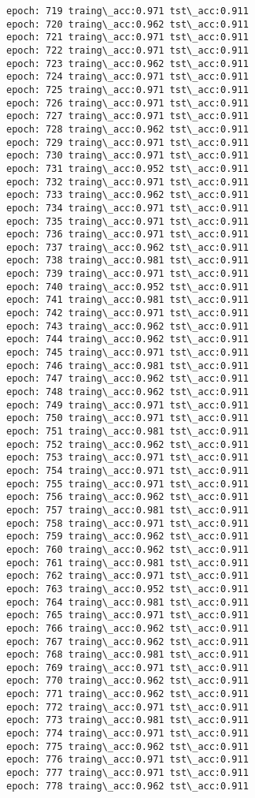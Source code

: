 \documentclass[11pt]{article}
\begin{document}
\begin{Verbatim}[commandchars=\\\{\}]
epoch: 719 traing\_acc:0.971 tst\_acc:0.911
epoch: 720 traing\_acc:0.962 tst\_acc:0.911
epoch: 721 traing\_acc:0.971 tst\_acc:0.911
epoch: 722 traing\_acc:0.971 tst\_acc:0.911
epoch: 723 traing\_acc:0.962 tst\_acc:0.911
epoch: 724 traing\_acc:0.971 tst\_acc:0.911
epoch: 725 traing\_acc:0.971 tst\_acc:0.911
epoch: 726 traing\_acc:0.971 tst\_acc:0.911
epoch: 727 traing\_acc:0.971 tst\_acc:0.911
epoch: 728 traing\_acc:0.962 tst\_acc:0.911
epoch: 729 traing\_acc:0.971 tst\_acc:0.911
epoch: 730 traing\_acc:0.971 tst\_acc:0.911
epoch: 731 traing\_acc:0.952 tst\_acc:0.911
epoch: 732 traing\_acc:0.971 tst\_acc:0.911
epoch: 733 traing\_acc:0.962 tst\_acc:0.911
epoch: 734 traing\_acc:0.971 tst\_acc:0.911
epoch: 735 traing\_acc:0.971 tst\_acc:0.911
epoch: 736 traing\_acc:0.971 tst\_acc:0.911
epoch: 737 traing\_acc:0.962 tst\_acc:0.911
epoch: 738 traing\_acc:0.981 tst\_acc:0.911
epoch: 739 traing\_acc:0.971 tst\_acc:0.911
epoch: 740 traing\_acc:0.952 tst\_acc:0.911
epoch: 741 traing\_acc:0.981 tst\_acc:0.911
epoch: 742 traing\_acc:0.971 tst\_acc:0.911
epoch: 743 traing\_acc:0.962 tst\_acc:0.911
epoch: 744 traing\_acc:0.962 tst\_acc:0.911
epoch: 745 traing\_acc:0.971 tst\_acc:0.911
epoch: 746 traing\_acc:0.981 tst\_acc:0.911
epoch: 747 traing\_acc:0.962 tst\_acc:0.911
epoch: 748 traing\_acc:0.962 tst\_acc:0.911
epoch: 749 traing\_acc:0.971 tst\_acc:0.911
epoch: 750 traing\_acc:0.971 tst\_acc:0.911
epoch: 751 traing\_acc:0.981 tst\_acc:0.911
epoch: 752 traing\_acc:0.962 tst\_acc:0.911
epoch: 753 traing\_acc:0.971 tst\_acc:0.911
epoch: 754 traing\_acc:0.971 tst\_acc:0.911
epoch: 755 traing\_acc:0.971 tst\_acc:0.911
epoch: 756 traing\_acc:0.962 tst\_acc:0.911
epoch: 757 traing\_acc:0.981 tst\_acc:0.911
epoch: 758 traing\_acc:0.971 tst\_acc:0.911
epoch: 759 traing\_acc:0.962 tst\_acc:0.911
epoch: 760 traing\_acc:0.962 tst\_acc:0.911
epoch: 761 traing\_acc:0.981 tst\_acc:0.911
epoch: 762 traing\_acc:0.971 tst\_acc:0.911
epoch: 763 traing\_acc:0.952 tst\_acc:0.911
epoch: 764 traing\_acc:0.981 tst\_acc:0.911
epoch: 765 traing\_acc:0.971 tst\_acc:0.911
epoch: 766 traing\_acc:0.962 tst\_acc:0.911
epoch: 767 traing\_acc:0.962 tst\_acc:0.911
epoch: 768 traing\_acc:0.981 tst\_acc:0.911
epoch: 769 traing\_acc:0.971 tst\_acc:0.911
epoch: 770 traing\_acc:0.962 tst\_acc:0.911
epoch: 771 traing\_acc:0.962 tst\_acc:0.911
epoch: 772 traing\_acc:0.971 tst\_acc:0.911
epoch: 773 traing\_acc:0.981 tst\_acc:0.911
epoch: 774 traing\_acc:0.971 tst\_acc:0.911
epoch: 775 traing\_acc:0.962 tst\_acc:0.911
epoch: 776 traing\_acc:0.971 tst\_acc:0.911
epoch: 777 traing\_acc:0.971 tst\_acc:0.911
epoch: 778 traing\_acc:0.962 tst\_acc:0.911

\end{Verbatim}
\end{document}
